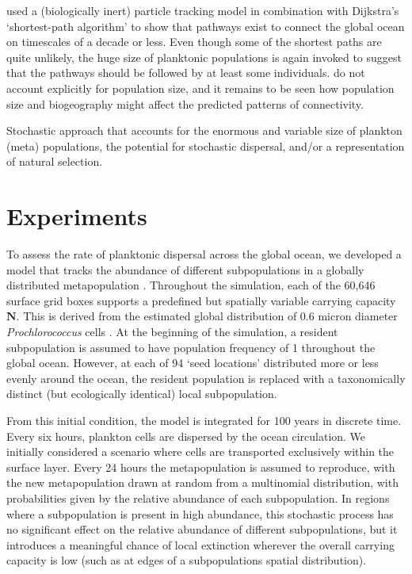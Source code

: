 \documentclass[12pt]{article}
\begin{document}
\citet{Jonsson:2016} used a (biologically inert) particle tracking model in combination with Dijkstra's `shortest-path algorithm' \citet[][]{Dijkstra:1959} to show that pathways exist to connect the global ocean on timescales of a decade or less. Even though some of the shortest paths are quite unlikely, the huge size of planktonic populations is again invoked to suggest that the pathways should be followed by at least some individuals.  \citet{Jonsson:2016} do not account explicitly for population size, and it remains to be seen how population size and biogeography might affect the predicted patterns of connectivity.


Stochastic approach that accounts for the enormous and variable size of plankton (meta) populations, the potential for stochastic dispersal, and/or a representation of natural selection.

\section{Experiments}

To assess the rate of planktonic dispersal across the global ocean, we developed a model that tracks the abundance of different subpopulations in a globally distributed metapopulation \citep{Cherry:2003}. Throughout the simulation, each of the 60,646 surface grid boxes supports a predefined but spatially variable carrying capacity $\mathbf{N}$. This is derived from the estimated global distribution of 0.6 micron diameter \textit{Prochlorococcus} cells \citep{Dutkiewicz:2019}. At the beginning of the simulation, a resident subpopulation is assumed to have population frequency of 1 throughout the global ocean. However, at each of 94 `seed locations' distributed more or less evenly around the ocean, the resident population is replaced with a taxonomically distinct (but ecologically identical) local subpopulation. 

From this initial condition, the model is integrated for 100 years in discrete time. Every six hours, plankton cells are dispersed by the ocean circulation. We initially considered a scenario where cells are transported exclusively within the surface layer. Every 24 hours the metapopulation is assumed to reproduce, with the new metapopulation drawn at random from a multinomial distribution, with probabilities given by the relative abundance of each subpopulation. In regions where a subpopulation is present in high abundance, this stochastic process has no significant effect on the relative abundance of different subpopulations, but it introduces a meaningful chance of local extinction wherever the overall carrying capacity is low (such as at edges of a subpopulations spatial distribution). 
\end{document}
